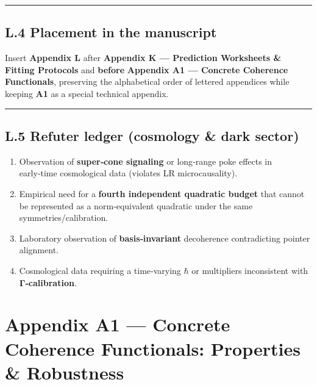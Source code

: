 \documentclass[
]{article}
\providecommand{\tightlist}{%
  \setlength{\itemsep}{0pt}\setlength{\parskip}{0pt}}
\numberwithin{equation}{section}
\begin{document}
\begin{center}\rule{0.5\linewidth}{0.5pt}\end{center}

\hypertarget{l.4-placement-in-the-manuscript}{%
\subsection{L.4 Placement in the
manuscript}\label{l.4-placement-in-the-manuscript}}

Insert \textbf{Appendix L} after \textbf{Appendix K --- Prediction
Worksheets \& Fitting Protocols} and \textbf{before} \textbf{Appendix A1
--- Concrete Coherence Functionals}, preserving the alphabetical order
of lettered appendices while keeping \textbf{A1} as a special technical
appendix.

\begin{center}\rule{0.5\linewidth}{0.5pt}\end{center}

\hypertarget{l.5-refuter-ledger-cosmology-dark-sector}{%
\subsection{L.5 Refuter ledger (cosmology \& dark
sector)}\label{l.5-refuter-ledger-cosmology-dark-sector}}

\begin{enumerate}
\def\labelenumi{\arabic{enumi}.}
\tightlist
\item
  Observation of \textbf{super‑cone signaling} or long‑range poke
  effects in early‑time cosmological data (violates LR microcausality).
\item
  Empirical need for a \textbf{fourth independent quadratic budget} that
  cannot be represented as a norm‑equivalent quadratic under the same
  symmetries/calibration.
\item
  Laboratory observation of \textbf{basis‑invariant} decoherence
  contradicting pointer alignment.
\item
  Cosmological data requiring a time‑varying \(\hbar\) or multipliers
  inconsistent with \textbf{Γ‑calibration}.
\end{enumerate}

\hypertarget{appendix-a1-concrete-coherence-functionals-properties-robustness}{%
\section{Appendix A1 --- Concrete Coherence Functionals: Properties \&
Robustness}\label{appendix-a1-concrete-coherence-functionals-properties-robustness}}
\end{document}
